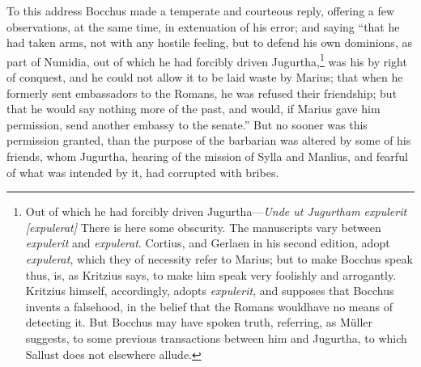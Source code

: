 To this address Bocchus made a temperate and courteous reply, offering
a few observations, at the same time, in extenuation of his error; and
saying ``that he had taken arms, not with any hostile feeling, but to
defend his own dominions, as part of Numidia, out of which he had
forcibly driven Jugurtha,\footnote{Out of which he had forcibly driven Jugurtha—\emph{Unde ut
Jugurtham expulerit [expulerat]} There is here some obscurity. The
manuscripts vary between \emph{expulerit} and \emph{expulerat}. Cortius, and
Gerlaen in his second edition, adopt \emph{expulerat}, which they of
necessity refer to Marius; but to make Bocchus speak thus, is, as
Kritzius says, to make him speak very foolishly and arrogantly.
Kritzius himself, accordingly, adopts \emph{expulerit}, and supposes that
Bocchus invents a falsehood, in the belief that the Romans wouldhave
no means of detecting it. But Bocchus may have spoken truth, referring,
as Müller suggests, to some previous transactions between him and
Jugurtha, to which Sallust does not elsewhere allude.} was his by right of conquest, and he
could not allow it to be laid waste by Marius; that when he formerly
sent embassadors to the Romans, he was refused their friendship; but
that he would say nothing more of the past, and would, if Marius gave
him permission, send another embassy to the senate.'' But no sooner was
this permission granted, than the purpose of the barbarian was altered
by some of his friends, whom Jugurtha, hearing of the mission of Sylla
and Manlius, and fearful of what was intended by it, had corrupted
with bribes.

